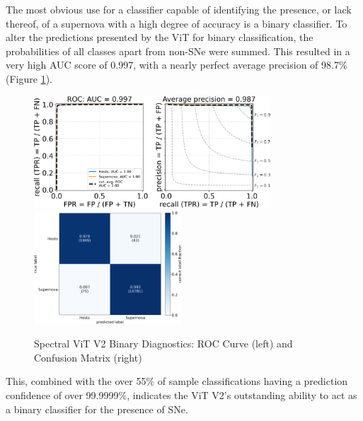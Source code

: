 The most obvious use for a classifier capable of identifying the presence, or lack thereof, of a supernova 
with a high degree of accuracy is a binary classifier. To alter the predictions presented by the ViT 
for binary classification, the probabilities of all classes apart from 
non-SNe were summed. This resulted in a very high AUC score of 0.997, with a 
nearly perfect average precision of 98.7\% (Figure \ref{fig:v2_binary_qual}).
\begin{figure}[t!]
    \centering
    \includegraphics[height=4.2cm]{figures/v2_real/vit_model_V2rocfull_binary_e26.png}
    \quad
    \includegraphics[height=4.2cm]{figures/v2_real/vit_model_V2cmfull_binary_e26.png}
    \caption[Spectral ViT V2 Binary Diagnostics]{Spectral ViT V2 Binary Diagnostics:
    ROC Curve (left) and Confusion Matrix (right)\label{fig:v2_binary_qual}}
\end{figure}
This, combined with the over 55\% of sample classifications having a prediction confidence of over 99.9999\%,
indicates the ViT V2's outstanding ability to act as a binary classifier for the presence of SNe.

